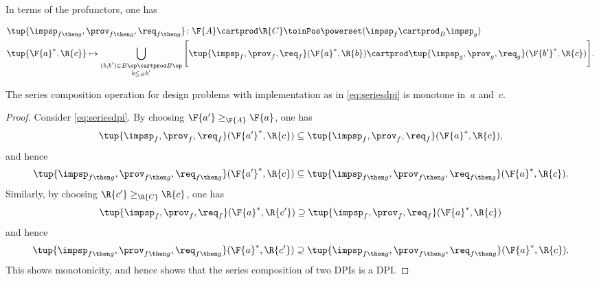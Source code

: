 {\begin{definition}
        In terms of the profunctors, one has
        \begin{widepar}
            \begin{equation}
                \label{eq:seriesdpi}
                \begin{aligned}
                     & \tup{\impsp_{f\then g},\prov_{f\then g},\req_{f\then g}}\colon \F{A}\cartprod \R{C} \toinPos \powerset(\impsp_f \cartprod_B \impsp_g) \\
                     & \tup{\F{a}^*,\R{c}} \mapsto \bigcup_{\substack{(b,b') \in B\op \cartprod B\op \\ b \leq_B b'}} \Bigg[ \tup{\impsp_f,\prov_f,\req_f}(\F{a}^*,\R{b}) \cartprod \tup{\impsp_g,\prov_g,\req_g}(\F{b'}^*,\R{c}) \Bigg].
                \end{aligned}
            \end{equation}
        \end{widepar}
    \end{definition}

    \begin{lemma}
        The series composition operation for design problems with implementation as in \cref{eq:seriesdpi} is monotone in~$a$ and~$c$.
    \end{lemma}
    \begin{proof}
        Consider \cref{eq:seriesdpi}.
        By choosing $\F{a'}\geq_\F{A} \F{a}$, one has
        \begin{equation}
            \tup{\impsp_{f},\prov_{f},\req_{f}}(\F{a'}^*,\R{c})\subseteq \tup{\impsp_{f},\prov_{f},\req_{f}}(\F{a}^*,\R{c}),
        \end{equation}
        and hence
        \begin{equation}
            \tup{\impsp_{f\then g},\prov_{f\then g},\req_{f\then g}}(\F{a'}^*,\R{c})\subseteq \tup{\impsp_{f\then g},\prov_{f\then g},\req_{f\then g}}(\F{a}^*,\R{c}).
        \end{equation}
        Similarly, by choosing $\R{c'}\geq_{\R{C}} \R{c}$, one has
        \begin{equation}
            \tup{\impsp_{f},\prov_{f},\req_{f}}(\F{a}^*,\R{c'})\supseteq \tup{\impsp_{f},\prov_{f},\req_{f}}(\F{a}^*,\R{c})
        \end{equation}
        and hence
        \begin{equation}
            \tup{\impsp_{f\then g},\prov_{f\then g},\req_{f\then g}}(\F{a}^*,\R{c'})\supseteq \tup{\impsp_{f\then g},\prov_{f\then g},\req_{f\then g}}(\F{a}^*,\R{c}).
        \end{equation}
        This shows monotonicity, and hence shows that the series composition of two DPIs is a DPI.
    \end{proof}

}
